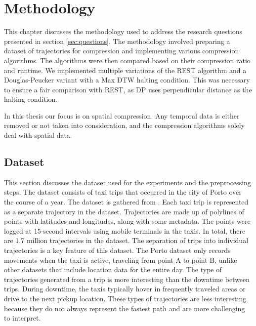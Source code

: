 \chapter{Methodology}
\label{chap:method}


This chapter discusses the methodology used to address the research questions presented in section \ref{sec:questions}. The methodology involved preparing a dataset of trajectories for compression and implementing various compression algorithms. The algorithms were then compared based on their compression ratio and runtime. We implemented multiple variations of the REST algorithm and a Douglas-Peucker variant with a Max DTW halting condition. This was necessary to ensure a fair comparison with REST, as DP uses perpendicular distance as the halting condition.

In this thesis our focus is on spatial compression. Any temporal data is either removed or not taken into consideration, and the compression algorithms solely deal with spatial data.

\section{Dataset}
This section discusses the dataset used for the experiments and the preprocessing steps. The dataset consists of taxi trips that occurred in the city of Porto over the course of a year. The dataset is gathered from \textcite{porto}. Each taxi trip is represented as a separate trajectory in the dataset. Trajectories are made up of polylines of points with latitudes and longitudes, along with some metadata. The points were logged at 15-second intervals using mobile terminals in the taxis. In total, there are 1.7 million trajectories in the dataset. The separation of trips into individual trajectories is a key feature of this dataset. The Porto dataset only records movements when the taxi is active, traveling from point A to point B, unlike other datasets that include location data for the entire day. The type of trajectories generated from a trip is more interesting than the downtime between trips. During downtime, the taxis typically hover in frequently traveled areas or drive to the next pickup location. These types of trajectories are less interesting because they do not always represent the fastest path and are more challenging to interpret.

